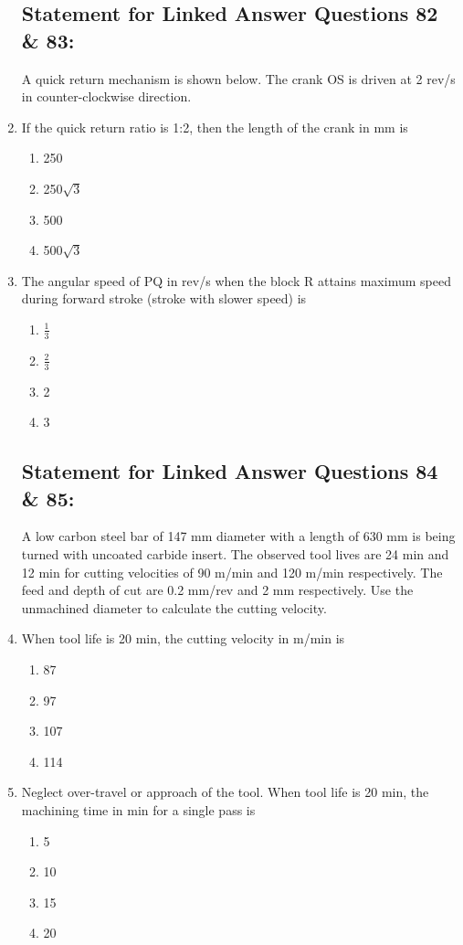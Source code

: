 \documentclass[journal,12pt,onecolumn]{IEEEtran}
\theoremstyle{remark}
\begin{document}
\begin{enumerate}
\subsection{Statement for Linked Answer Questions 82 \& 83:}

A quick return mechanism is shown below. The crank OS is driven at 2 rev/s in counter-clockwise direction.
\begin{center}

\end{center}
    \item If the quick return ratio is 1:2, then the length of the crank in mm is
    \begin{enumerate}
        \item 250
        \item 250$\sqrt{3}$
        \item 500
        \item 500$\sqrt{3}$
    \end{enumerate}
    
    \item The angular speed of PQ in rev/s when the block R attains maximum speed during forward stroke (stroke with slower speed) is
    \begin{enumerate}
	\item $\frac{1}{3}$
	\item $\frac{2}{3}$
        \item 2
        \item 3
    \end{enumerate}

\subsection{Statement for Linked Answer Questions 84 \& 85:}

A low carbon steel bar of 147 mm diameter with a length of 630 mm is being turned with uncoated carbide insert. The observed tool lives are 24 min and 12 min for cutting velocities of 90 m/min and 120 m/min respectively. The feed and depth of cut are 0.2 mm/rev and 2 mm respectively. Use the unmachined diameter to calculate the cutting velocity.

    \item When tool life is 20 min, the cutting velocity in m/min is
    \begin{enumerate}
        \item 87
        \item 97
        \item 107
        \item 114
    \end{enumerate}
    
    \item Neglect over-travel or approach of the tool. When tool life is 20 min, the machining time in min for a single pass is
    \begin{enumerate}
        \item 5
        \item 10
        \item 15
        \item 20
    \end{enumerate}




\end{enumerate}
\end{document}
